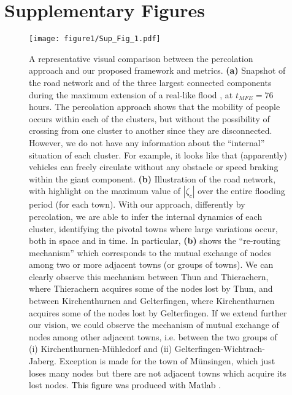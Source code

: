 \documentclass[fleqn,10pt]{wlscirep_SI}
\begin{document}



% 
%
\section*{Supplementary Figures}
%
%
\begin{figure}[H]
\centering
\texttt{[image: figure1/Sup\_Fig\_1.pdf]}


\caption{A representative visual comparison between the percolation approach and our proposed framework and metrics.
\textbf{(a)} Snapshot of the road network and of the three largest connected components during the maximum extension of a real-like flood \citep{Zischg}, at $t_{MFE}=76$ hours. The percolation approach shows that the mobility of people occurs within each of the clusters, but without the possibility of crossing from one cluster to another since they are disconnected. However, we do not have any information about the ``internal'' situation of each cluster. For example, it looks like that (apparently) vehicles can freely circulate without any obstacle or speed braking within the giant component.
\textbf{(b)} Illustration of the road network, with highlight on the maximum value of $|\zeta_c|$ over the entire flooding period (for each town). With our approach, differently by percolation, we are able to infer the internal dynamics of each cluster, identifying the pivotal towns where large variations occur, both in space and in time. In particular, \textbf{(b)} shows the ``re-routing mechanism'' which corresponds to the mutual exchange of nodes among two or more adjacent towns (or groups of towns). We can clearly observe this mechanism between Thun and Thierachern, where Thierachern acquires some of the nodes lost by Thun, and between Kirchenthurnen and Gelterfingen, where Kirchenthurnen acquires some of the nodes lost by Gelterfingen. If we extend further our vision, we could observe the mechanism of mutual exchange of nodes among other adjacent towns, i.e. between the two groups of (i) Kirchenthurnen-Mühledorf and (ii) Gelterfingen-Wichtrach-Jaberg. Exception is made for the town of Münsingen, which just loses many nodes but there are not adjacent towns which acquire its lost nodes. 
\textcolor{black}{This figure was produced with Matlab \cite{MATLAB2019}.}
}
\label{fig:map_giantcomponent_76_hour}
\end{figure}
\end{document}
